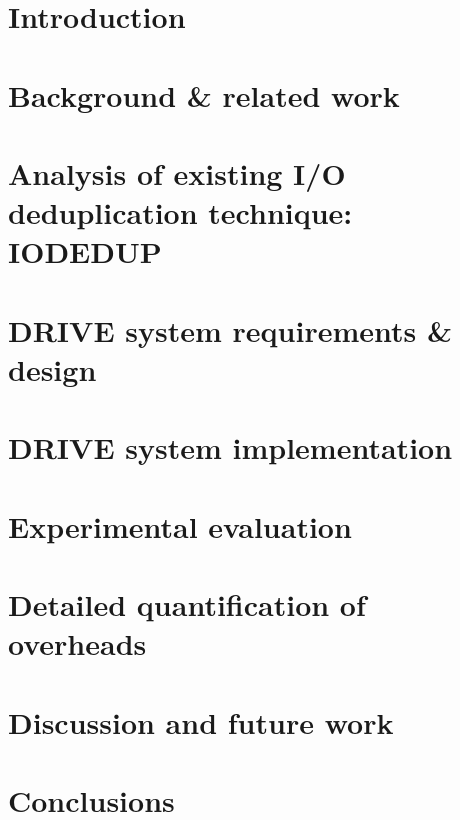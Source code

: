 \section{Introduction}
\label{sec:drivechap-intro}


\section{Background \& related work}
\label{sec:drivechap-background}


\section{Analysis of existing I/O deduplication technique: \\ IODEDUP}%
\label{sec:thesis-iodedup}


\section{DRIVE system requirements \& design}
\label{sec:drivechap-design}


\section{DRIVE system implementation}
\label{sec:drivechap-implementation}

%

\section{Experimental evaluation} 
\label{sec:drivechap-experimental-eval}


\section{Detailed quantification of overheads}
\label{sec:drivechap-overheads}


\section{Discussion and future work}
\label{sec:drivechap-future-work}


\section{Conclusions}
\label{sec:drivechap-conclusions}







